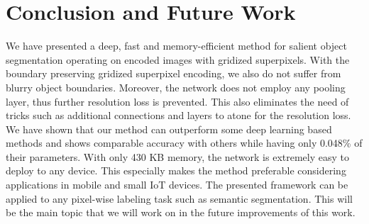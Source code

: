 \documentclass[a4paper,conference]{IEEEtran}
\begin{document}
\section{Conclusion and Future Work}  \label{Conc}
We have presented a deep, fast and memory-efficient method for salient object segmentation operating on encoded images with gridized superpixels. With the boundary preserving gridized superpixel encoding, we also do not suffer from blurry object boundaries. Moreover, the network does not employ any pooling layer, thus further resolution loss is prevented. This also eliminates the need of tricks such as additional connections and layers to atone for the resolution loss. We have shown that our method can outperform some deep learning based methods and shows comparable accuracy with others while having only 0.048\% of their parameters. With only 430 KB memory, the network is extremely easy to deploy to any device. This especially makes the method preferable considering applications in mobile and small IoT devices. The presented framework can be applied to any pixel-wise labeling task such as semantic segmentation. This will be the main topic that we will work on in the future improvements of this work.





%
%

\end{document}
